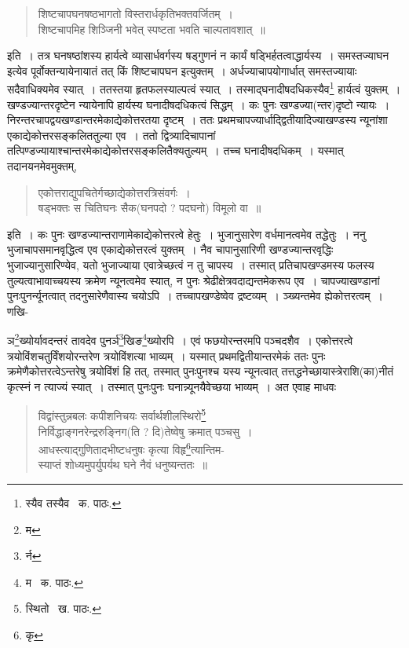 \documentclass[11pt, openany]{book}
\begin{document}
\begin{quote}
{\qt शिष्टचापघनषष्ठभागतो विस्तरार्धकृतिभक्तवर्जितम्~।\\
शिष्टचापमिह शिञ्जिनी भवेत् स्पष्टता भवति चाल्पतावशात्~॥}
\end{quote}

\noindent इति~। तत्र घनषष्ठांशस्य हार्यत्वे व्यासार्धवर्गस्य षड्गुणनं न कार्यं षड्भिर्हतत्वाद्धार्यस्य~। समस्तज्याघन इत्येव पूर्वोक्तन्यायेनायातं तत् किं शिष्टचापघन इत्युक्तम्~। अर्धज्याचापयोगार्धात् समस्तज्यायाः सदैवाधिक्यमेव स्यात्~। ततस्तया हृतफलस्याल्पत्वं स्यात्~। तस्माद्घनादीषदधिकस्यैव\renewcommand{\thefootnote}{१}\footnote{स्यैव तस्यैव \textendash\ क. पाठः.} हार्यत्वं युक्तम्~। खण्डज्यान्तरदृष्टेन न्यायेनापि हार्यस्य घनादीषदधिकत्वं सिद्धम्~। कः पुनः खण्डज्या(न्तर)दृष्टो न्यायः~। निरन्तरचापद्वयखण्डान्तरमेकाद्येकोत्तरतया दृष्टम्~। ततः प्रथमचापज्यार्धाद्द्वितीयादिज्याखण्डस्य न्यूनांशा एकाद्येकोत्तरसङ्कलिततुल्या एव~। ततो
द्वित्र्यादिचापानां तत्पिण्डज्यायाश्चान्तरमेकाद्येकोत्तरसङ्कलितैक्यतुल्यम्~। तच्च घनादीषदधिकम्~। यस्मात् तदानयनमेवमुक्तम्,

\begin{quote}
{\qt एकोत्तराद्युपचितेर्गच्छाद्येकोत्तरत्रिसंवर्गः~।\\
षड्भक्तः स चितिघनः सैक(घनपदो ? पदघनो) विमूलो वा~॥}
\end{quote}

\noindent इति~। कः पुनः खण्डज्यान्तराणामेकाद्येकोत्तरत्वे हेतुः~। भुजानुसारेण वर्धमानत्वमेव तद्धेतुः~। ननु भुजाचापसमानवृद्धित्व एव एकाद्येकोत्तरत्वं युक्तम्~। नैव चापानुसारिणी खण्डज्यान्तरवृद्धिः भुजाज्यानुसारिण्येव, यतो भुजाज्याया एवात्रेच्छत्वं न तु चापस्य~। तस्मात् प्रतिचापखण्डमस्य फलस्य तुल्यत्वाभावाच्चयस्य क्रमेण न्यूनत्वमेव स्यात्, न पुनः श्रेढीक्षेत्रवदाद्यन्तमेकरूप एव~। चापज्याखण्डानां पुनःपुनर्न्यूनत्वात् तदनुसारेणैवास्य चयोऽपि~। तच्चापखण्डेष्वेव द्रष्टव्यम्~। ञ्ख्यन्तमेव ह्येकोत्तरत्वम्~। णखि-

\newpage

\noindent ञ\renewcommand{\thefootnote}{१}\footnote{म}ख्योर्यावदन्तरं तावदेव पुनर्ञ\renewcommand{\thefootnote}{२}\footnote{र्न}खिङ\renewcommand{\thefootnote}{३}\footnote{म \textendash\ क. पाठः.}ख्योरपि~। एवं फछयोरन्तरमपि पञ्चदशैव~। एकोत्तरत्वे त्रयोविंशचतुर्विंशयोरन्तरेण त्रयोविंशत्या भाव्यम्~। यस्मात् प्रथमद्वितीयान्तरमेकं ततः पुनः क्रमेणैकोत्तरत्वेऽन्तरेषु त्रयोविंशं हि तत्, तस्मात् पुनःपुनश्च यस्य न्यूनत्वात् तत्तद्धनेच्छायास्त्रेराशि(का)नीतं कृत्स्नं न त्याज्यं स्यात्~। तस्मात् पुनःपुनः घनान्न्यूनयैवेच्छया भाव्यम्~। अत एवाह माधवः\textendash 

\begin{quote}
{\qt विद्वांस्तुन्नबलः कपीशनिचयः सर्वार्थशीलस्थिरो\renewcommand{\thefootnote}{४}\footnote{स्थितो \textendash\ ख. पाठः.}\\
निर्विद्धाङ्गनरेन्द्ररुङ्निग(ति ? दि)तेष्वेषु क्रमात् पञ्चसु~।\\
आधस्त्याद्गुणितादभीष्टधनुषः कृत्या विहृ\renewcommand{\thefootnote}{५}\footnote{कृ}त्यान्तिम-\\
स्याप्तं शोध्यमुपर्युपर्यथ घने नैवं धनुष्यन्ततः~॥}
\end{quote}
\end{document}

